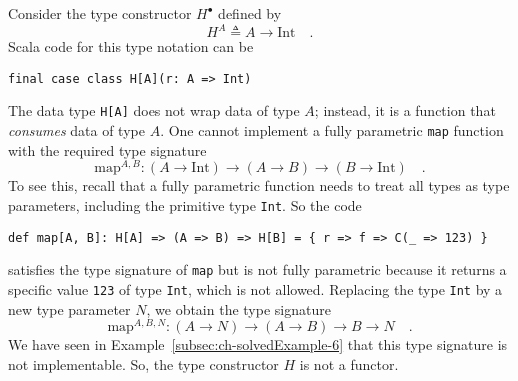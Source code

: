 Consider the type constructor $H^{\bullet}$ defined by
\[
H^{A}\triangleq A\rightarrow\text{Int}\quad.
\]
Scala code for this type notation can be
\begin{lstlisting}
final case class H[A](r: A => Int)
\end{lstlisting}
The data type \lstinline!H[A]! does not wrap data of type $A$; instead,
it is a function that \emph{consumes} data of type $A$. One cannot
implement a fully parametric \lstinline!map! function with the required
type signature 
\[
\text{map}^{A,B}:\left(A\rightarrow\text{Int}\right)\rightarrow\left(A\rightarrow B\right)\rightarrow\left(B\rightarrow\text{Int}\right)\quad.
\]
To see this, recall that a fully
parametric function needs to treat all types as type parameters, including
the primitive type \lstinline!Int!. So the code
\begin{lstlisting}
def map[A, B]: H[A] => (A => B) => H[B] = { r => f => C(_ => 123) }
\end{lstlisting}
satisfies the type signature of \lstinline!map! but is not fully
parametric because it returns a specific value \lstinline!123! of
type \lstinline!Int!, which is not allowed. Replacing the type \lstinline!Int!
by a new type parameter $N$, we obtain the type signature
\[
\text{map}^{A,B,N}:\left(A\rightarrow N\right)\rightarrow\left(A\rightarrow B\right)\rightarrow B\rightarrow N\quad.
\]
We have seen in Example~\ref{subsec:ch-solvedExample-6} that this
type signature is not implementable. So, the type constructor $H$
is not a functor.

